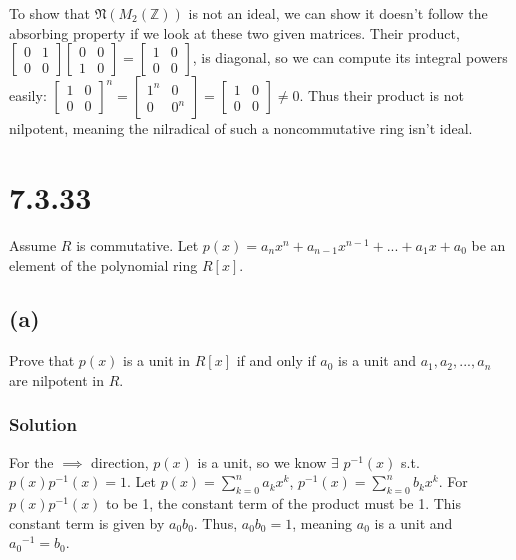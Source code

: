 \documentclass[fleqn]{article}
\begin{document}
        To show that $\mathfrak{N}(M_2(\mathbb{Z}))$ is not an ideal, we can show it doesn't follow the absorbing property if we look at these two given matrices.  Their product, $\begin{bmatrix}
            0 & 1 \\
            0 & 0
        \end{bmatrix} \begin{bmatrix}
            0 & 0 \\
            1 & 0
        \end{bmatrix} = \begin{bmatrix}
            1 & 0 \\
            0 & 0
        \end{bmatrix}$, is diagonal, so we can compute its integral powers easily: $\begin{bmatrix}
            1 & 0 \\
            0 & 0
        \end{bmatrix}^n = \begin{bmatrix}
            1^n & 0 \\
            0 & 0^n
        \end{bmatrix} = \begin{bmatrix}
            1 & 0 \\
            0 & 0
        \end{bmatrix} \neq 0$.  Thus their product is not nilpotent, meaning the nilradical of such a noncommutative ring isn't ideal.

    \section{7.3.33}
    Assume $R$ is commutative.  Let $p(x) = a_n x^n + a_{n - 1} x^{n - 1} + ... + a_1 x + a_0$ be an element of the polynomial ring $R[x]$.
        
        \subsection{(a)}
        Prove that $p(x)$ is a unit in $R[x]$ if and only if $a_0$ is a unit and $a_1, a_2, ..., a_n$ are nilpotent in $R$.
            
            \subsubsection{Solution}
            For the $\implies$ direction, $p(x)$ is a unit, so we know $\exists$ $p^{-1}(x)$ s.t.\ $p(x) p^{-1}(x) = 1$.  Let $p(x) = \sum\limits_{k = 0}^{n} a_k x^k$, $p^{-1}(x) = \sum\limits_{k = 0}^{n} b_k x^k$.  For $p(x)p^{-1}(x)$ to be 1, the constant term of the product must be 1.  This constant term is given by $a_0 b_0$.  Thus, $a_0 b_0 = 1$, meaning $a_0$ is a unit and ${a_0}^{-1} = b_0$.
            
\end{document}

